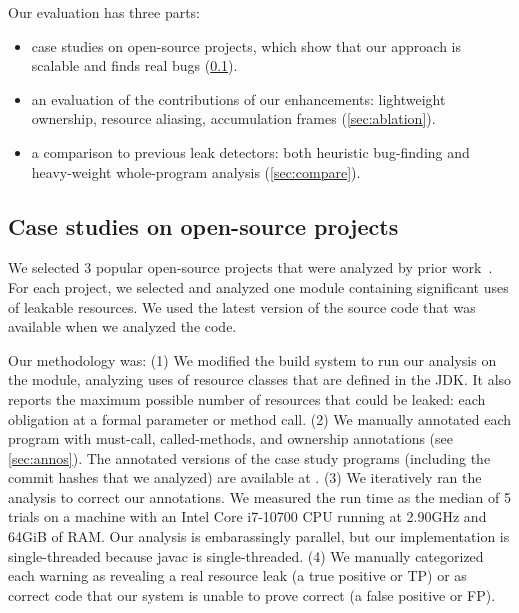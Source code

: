 Our evaluation has three parts:
\begin{itemize}
\item case studies on open-source projects, which show that our approach
  is scalable and finds real bugs (\cref{sec:case-studies}).
\item an evaluation of the contributions of our enhancements:
  lightweight ownership, %
  resource aliasing, %
  accumulation frames %
  (\cref{sec:ablation}).
\item a comparison to previous leak detectors:  both heuristic bug-finding
  and heavy-weight whole-program
  analysis (\cref{sec:compare}).
\end{itemize}

\subsection{Case studies on open-source projects}
\label{sec:case-studies}

We selected 3 popular open-source projects that were analyzed by prior work~\cite{zuo2019grapple}.
For each project, we selected and analyzed one module
containing significant uses of leakable resources. We used
the latest version of the source code that was available
when we analyzed the code.

Our methodology was:
(1)
We modified the
build system to run our analysis on the module, analyzing uses of resource
classes that are defined in the JDK\@.
It also reports the maximum possible number of resources that could be
leaked:  each obligation at a formal parameter or method call.
(2) We manually
annotated each program with must-call, called-methods, and ownership
annotations (see \cref{sec:annos}).
The
annotated versions of the case study programs (including
the commit hashes that we analyzed) are available at
.
(3) We iteratively ran the analysis to correct our annotations.
We measured the run time
as the median of 5 trials on
a machine with an Intel Core i7-10700 CPU running at 2.90GHz and 64GiB of RAM\@.
Our analysis is embarassingly parallel, but our implementation is
single-threaded because javac is single-threaded.
(4) We manually categorized each warning as revealing a
real resource leak (a true positive or TP) or as correct code that our
system is unable to prove correct (a false positive or FP\@).

